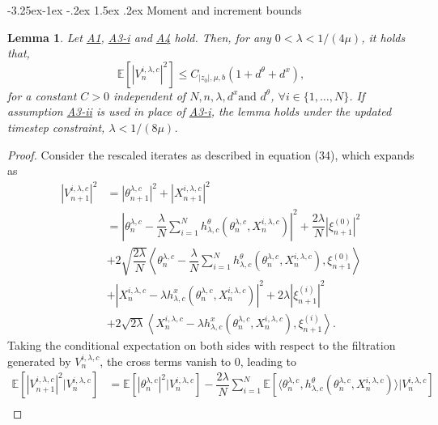 \documentclass[a4paper, 10pt]{article}
\makeatletter
\theoremstyle{plain}%
\newtheorem{lemma}{Lemma}%
\renewcommand\subsubsection{\@startsection{subsubsection}{3}{\z@}%
  {-3.25ex\@plus -1ex \@minus -.2ex}%
  {1.5ex \@plus .2ex}%
  {\normalfont\small\itshape\mdseries}}
\makeatother
\begin{document}
\subsubsection{Moment and increment bounds}
\begin{lemma}\label{lemma4} Let \hyperlink{Assum1}{A1}, \hyperlink{Assum3a}{A3-i} and \hyperlink{Assum4}{A4} hold. Then, for any $0<\lambda<1/(4\mu)$, it holds that,
$$\mathbb{E}\left[|V_{n}^{i,\lambda,c}|^2\right]\leq C_{|z_0|,\mu,b}(1+d^{\theta}+d^x),$$
for a constant $C>0$ independent of $N,n,\lambda, d^x \text{and } d^{\theta}$, $\forall i\in\{1,\ldots,N\}$. If assumption \hyperlink{Assum3b}{A3-ii} is used in place of \hyperlink{Assum3a}{A3-i}, the lemma holds under the updated timestep constraint, $\lambda<1/(8\mu)$.\end{lemma}
\begin{proof} Consider the rescaled iterates as described in equation (34), which expands as
    \begin{align*}
\left|V_{n+1}^{i,\lambda,c}\right|^2&=\left|\theta_{n+1}^{\lambda,c}\right|^2+ \left|X_{n+1}^{i,\lambda,c}\right|^2\\ 
&=\left|\theta_{n}^{\lambda,c}-\dfrac{\lambda}{N}\sum_{i=1}^N h^{\theta}_{\lambda,c}(\theta_{n}^{\lambda,c},X_{n}^{i,\lambda,c})\right|^2+\dfrac{2\lambda}{N}|\xi^{(0)}_{n+1}|^2\\&+2\sqrt{\dfrac{2\lambda}{N}}\left\langle \theta_{n}^{\lambda,c}-\dfrac{\lambda}{N}\sum_{i=1}^N h^{\theta}_{\lambda,c}(\theta_{n}^{\lambda,c},X_{n}^{i,\lambda,c}),\xi_{n+1}^{(0)}\right\rangle\\
&+\left|X_{n}^{i,\lambda,c}-\lambda h^{x}_{\lambda,c}(\theta_{n}^{\lambda,c},X_{n}^{i,\lambda,c})\right|^2+2\lambda|\xi^{(i)}_{n+1}|^2\\&+2\sqrt{2\lambda}\left\langle X_{n}^{i,\lambda,c}-\lambda h^{x}_{\lambda,c}(\theta_{n}^{\lambda,c},X_{n}^{i,\lambda,c}),\xi_{n+1}^{(i)}\right\rangle.
\end{align*}
Taking the conditional expectation on both sides with respect to the filtration generated by $V_{n}^{i,\lambda,c}$, the cross terms vanish to $0$, leading to
\begin{align*}
\mathbb{E}\left[\left|V_{n+1}^{i,\lambda,c}\right|^2|V_{n}^{i,\lambda,c}\right]&=\mathbb{E}\left[\left|\theta_{n}^{\lambda,c}\right|^2|V_{n}^{i,\lambda,c}\right]-\dfrac{2\lambda}{N}\sum_{i=1}^N\mathbb{E}\left[\langle \theta_n^{\lambda,c},h_{\lambda,c}^{\theta}(\theta_{n}^{\lambda,c},X_{n}^{i,\lambda,c})\rangle |V_{n}^{i,\lambda,c}\right]\\

\end{align*}
\end{proof}
\end{document}
